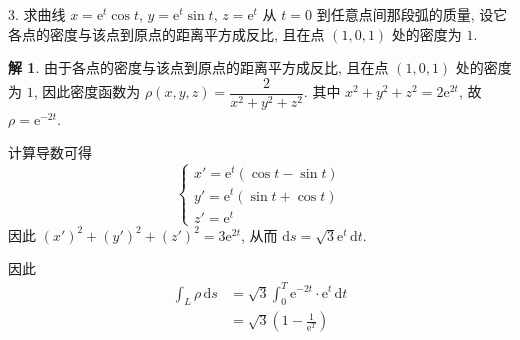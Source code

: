 \documentclass[a4paper,12pt]{article}
\theoremstyle{definition}
\newtheorem*{sol}{解}
\begin{document}
3. 求曲线 $x = \mathrm{e}^t \cos t$, $y = \mathrm{e}^t \sin t$, $z = \mathrm{e}^t$ 从 $t = 0$ 到任意点间那段弧的质量, 设它各点的密度与该点到原点的距离平方成反比, 且在点 $(1,0,1)$ 处的密度为 $1$.
\begin{sol}
    由于各点的密度与该点到原点的距离平方成反比, 且在点 $(1,0,1)$ 处的密度为 $1$, 因此密度函数为 $\rho(x,y,z) = \dfrac{2}{x^2 + y^2 + z^2}$. 其中 $x^2 + y^2 + z^2 = 2\mathrm{e}^{2t}$, 故 $\rho = \mathrm{e}^{-2t}$.

    计算导数可得
    $$
        \begin{cases}
            x' = \mathrm{e}^t(\cos t - \sin t) \\
            y' = \mathrm{e}^t(\sin t + \cos t) \\
            z' = \mathrm{e}^t
        \end{cases}
    $$
    因此 $(x')^2 + (y')^2 + (z')^2 = 3\mathrm{e}^{2t}$, 从而 $\mathrm{d}s = \sqrt{3}\mathrm{e}^t \, \mathrm{d}t$.

    因此
    \begin{align*}
        \int_L \rho \, \mathrm{d}s
         & = \sqrt{3} \int_0^T \mathrm{e}^{-2t} \cdot \mathrm{e}^t \, \mathrm{d}t \\
         & = \sqrt{3} \left( 1 - \frac{1}{\mathrm{e}^T} \right)
    \end{align*}
\end{sol}
\end{document}
